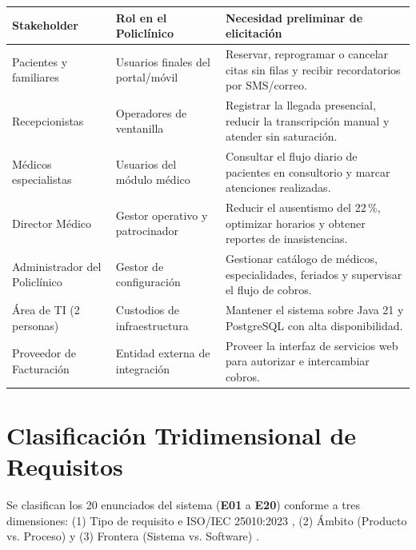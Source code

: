\documentclass[conference]{IEEEtran}
\begin{document}
	\begin{center}
		\centering
		\footnotesize
		\begin{tabularx}{\textwidth}{@{}p{3.2cm}p{3.2cm}Y@{}}
			\toprule
			\textbf{Stakeholder} & \textbf{Rol en el Policl\'inico} & \textbf{Necesidad preliminar de elicitaci\'on}\\
			\midrule
			Pacientes y familiares & Usuarios finales del portal/m\'ovil & Reservar, reprogramar o cancelar citas sin filas y recibir recordatorios por SMS/correo.\\
			Recepcionistas & Operadores de ventanilla & Registrar la llegada presencial, reducir la transcripci\'on manual y atender sin saturaci\'on.\\
			M\'edicos especialistas & Usuarios del m\'odulo m\'edico & Consultar el flujo diario de pacientes en consultorio y marcar atenciones realizadas.\\
			Director M\'edico & Gestor operativo y patrocinador & Reducir el ausentismo del 22\,\%, optimizar horarios y obtener reportes de inasistencias.\\
			Administrador del Policl\'inico & Gestor de configuraci\'on & Gestionar cat\'alogo de m\'edicos, especialidades, feriados y supervisar el flujo de cobros.\\
			\'Area de TI (2 personas) & Custodios de infraestructura & Mantener el sistema sobre Java 21 y PostgreSQL con alta disponibilidad.\\
			Proveedor de Facturaci\'on & Entidad externa de integraci\'on & Proveer la interfaz de servicios web para autorizar e intercambiar cobros.\\
			\bottomrule
		\end{tabularx}
	\end{center}
	
	\section{Clasificaci\'on Tridimensional de Requisitos}
	Se clasifican los 20 enunciados del sistema (\textbf{E01} a \textbf{E20}) conforme a tres dimensiones: (1) Tipo de requisito e ISO/IEC 25010:2023 \cite{iso25010}, (2) \'Ambito (Producto vs. Proceso) y (3) Frontera (Sistema vs. Software) \cite{pohl2025, iso29148}.
	
\end{document}
